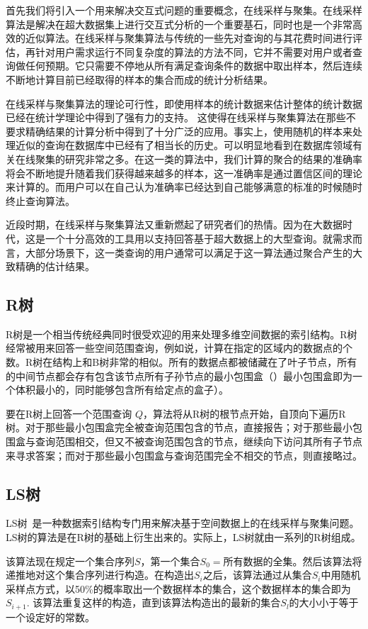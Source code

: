 首先我们将引入一个用来解决交互式问题的重要概念，在线采样与聚集。在线采样算法是解决在超大数据集上进行交互式分析的一个重要基石，同时也是一个非常高效的近似算法。在线采样与聚集算法与传统的一些先对查询的与其花费时间进行评估，再针对用户需求运行不同复杂度的算法的方法不同，它并不需要对用户或者查询做任何预期。它只需要不停地从所有满足查询条件的数据中取出样本，然后连续不断地计算目前已经取得的样本的集合而成的统计分析结果。

在线采样与聚集算法的理论可行性，即使用样本的统计数据来估计整体的统计数据已经在统计学理论中得到了强有力的支持。 这使得在线采样与聚集算法在那些不要求精确结果的计算分析中得到了十分广泛的应用。事实上，使用随机的样本来处理近似的查询在数据库中已经有了相当长的历史。可以明显地看到在数据库领域有关在线聚集的研究非常之多。在这一类的算法中，我们计算的聚合的结果的准确率将会不断地提升随着我们获得越来越多的样本，这一准确率是通过置信区间的理论来计算的。而用户可以在自己认为准确率已经达到自己能够满意的标准的时候随时终止查询算法。

近段时期，在线采样与聚集算法又重新燃起了研究者们的热情。因为在大数据时代，这是一个十分高效的工具用以支持回答基于超大数据上的大型查询。就需求而言，大部分场景下，这一类查询的用户通常可以满足于这一算法通过聚合产生的大致精确的估计结果。

\subsection{R树}
R树是一个相当传统经典同时很受欢迎的用来处理多维空间数据的索引结构。R树经常被用来回答一些空间范围查询，例如说，计算在指定的区域内的数据点的个数。R树在结构上和B树非常的相似。所有的数据点都被储藏在了叶子节点，所有的中间节点都会存有包含该节点所有子孙节点的最小包围盒（）最小包围盒即为一个体积最小的，同时能够包含所有给定点的盒子）。

要在R树上回答一个范围查询 $Q$，算法将从R树的根节点开始，自顶向下遍历R树。对于那些最小包围盒完全被查询范围包含的节点，直接报告；对于那些最小包围盒与查询范围相交，但又不被查询范围包含的节点，继续向下访问其所有子节点来寻求答案；而对于那些最小包围盒与查询范围完全不相交的节点，则直接略过。

\subsection{LS树}
LS树~\cite{RS}是一种数据索引结构专门用来解决基于空间数据上的在线采样与聚集问题。LS树的算法是在R树的基础上衍生出来的。实际上，LS树就由一系列的R树组成。

该算法现在规定一个集合序列$ S $，第一个集合$ S_{0}= $所有数据的全集。然后该算法将递推地对这个集合序列进行构造。在构造出$ S_{i} $之后，该算法通过从集合$ S_{i} $中用随机采样点方式，以50\%的概率取出一个数据样本的集合，这个数据样本的集合即为$ S_{i+1} $. 该算法重复这样的构造，直到该算法构造出的最新的集合$ S_{l} $的大小小于等于一个设定好的常数。

